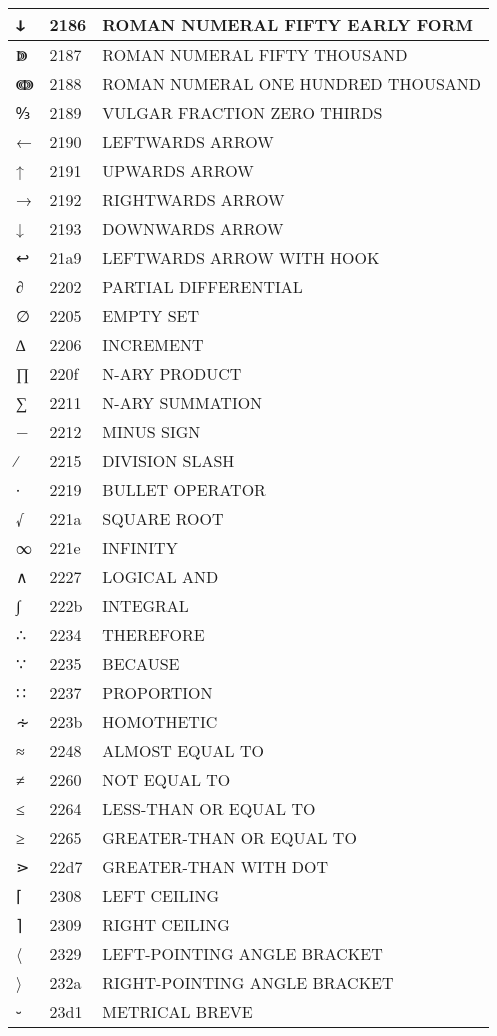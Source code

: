 \documentclass[12pt,letterpaper,openany]{book}
\begin{document}
\begin{center}
\begin{supertabular}{|m{0.25in}|m{0.5in}|m{4in}|}
ↆ & 2186 & ROMAN NUMERAL FIFTY EARLY FORM\\\hline
ↇ & 2187 & ROMAN NUMERAL FIFTY THOUSAND\\\hline
ↈ & 2188 & ROMAN NUMERAL ONE HUNDRED THOUSAND\\\hline
↉ & 2189 & VULGAR FRACTION ZERO THIRDS\\\hline
← & 2190 & LEFTWARDS ARROW\\\hline
↑ & 2191 & UPWARDS ARROW\\\hline
→ & 2192 & RIGHTWARDS ARROW\\\hline
↓ & 2193 & DOWNWARDS ARROW\\\hline
↩ & 21a9 & LEFTWARDS ARROW WITH HOOK\\\hline
∂ & 2202 & PARTIAL DIFFERENTIAL\\\hline
∅ & 2205 & EMPTY SET\\\hline
∆ & 2206 & INCREMENT\\\hline
∏ & 220f & N-ARY PRODUCT\\\hline
∑ & 2211 & N-ARY SUMMATION\\\hline
− & 2212 & MINUS SIGN\\\hline
∕ & 2215 & DIVISION SLASH\\\hline
∙ & 2219 & BULLET OPERATOR\\\hline
√ & 221a & SQUARE ROOT\\\hline
∞ & 221e & INFINITY\\\hline
∧ & 2227 & LOGICAL AND\\\hline
∫ & 222b & INTEGRAL\\\hline
∴ & 2234 & THEREFORE\\\hline
∵ & 2235 & BECAUSE\\\hline
∷ & 2237 & PROPORTION\\\hline
∻ & 223b & HOMOTHETIC\\\hline
≈ & 2248 & ALMOST EQUAL TO\\\hline
≠ & 2260 & NOT EQUAL TO\\\hline
≤ & 2264 & LESS-THAN OR EQUAL TO\\\hline
≥ & 2265 & GREATER-THAN OR EQUAL TO\\\hline
⋗ & 22d7 & GREATER-THAN WITH DOT\\\hline
⌈ & 2308 & LEFT CEILING\\\hline
⌉ & 2309 & RIGHT CEILING\\\hline
〈 & 2329 & LEFT-POINTING ANGLE BRACKET\\\hline
〉 & 232a & RIGHT-POINTING ANGLE BRACKET\\\hline
⏑ & 23d1 & METRICAL BREVE\\\hline

\end{supertabular}
\end{center}
\end{document}
